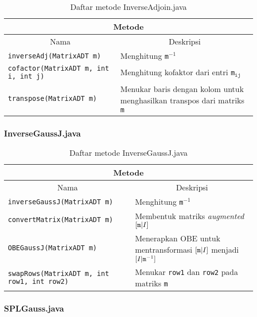 \begin{table}[H]
    \centering
    \caption{Daftar metode InverseAdjoin.java}
    \begin{tabular}{p{}|p{}}
        \hline
        \hline
        \multicolumn{2}{c}{\textbf{Metode}}\\
        \hline
        \hline
         \multicolumn{1}{c|}{Nama}  & \multicolumn{1}{c}{Deskripsi} \\
         \hline 
         \hline 
         \verb+inverseAdj(MatrixADT m)+ & Menghitung \verb+m+$^{-1}$  \\[.5em]
         \verb+cofactor(MatrixADT m, int i, int j)+ & Menghitung kofaktor dari entri \verb+m+$_{\texttt{ij}}$  \\[.5em]
         \verb+transpose(MatrixADT m)+ & Menukar baris dengan kolom untuk menghasilkan transpos dari matriks \verb+m+
    \end{tabular}
\end{table}

\subsubsection{InverseGaussJ.java}

\begin{table}[H]
    \centering
    \caption{Daftar metode InverseGaussJ.java}
    \begin{tabular}{p{}|p{}}
        \hline
        \hline
        \multicolumn{2}{c}{\textbf{Metode}}\\
        \hline
        \hline
        \multicolumn{1}{c|}{Nama}  & \multicolumn{1}{c}{Deskripsi} \\
        \hline 
        \hline 
        \verb+inverseGaussJ(MatrixADT m)+  & Menghitung \verb+m+$^{-1}$ \\[.5em]
        \verb+convertMatrix(MatrixADT m)+  & Membentuk matriks \textit{augmented} $[\verb+m+ | I]$ \\[.5em]
        \verb+OBEGaussJ(MatrixADT m)+      & Menerapkan OBE untuk mentransformasi $[\verb+m+ | I]$ menjadi $[I | \verb+m+^{-1}]$ \\[.5em]
        \verb+swapRows(MatrixADT m, int row1, int row2)+ & Menukar \verb+row1+ dan \verb+row2+ pada matriks \verb+m+
    \end{tabular}
\end{table}

\subsubsection{SPLGauss.java}

